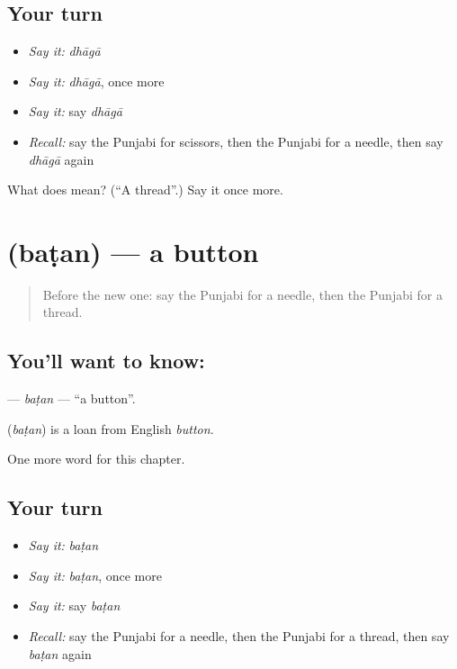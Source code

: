 \subsection*{Your turn}
\begin{itemize}
\raggedright
  \item \emph{Say it:} \emph{dhāgā}
  \item \emph{Say it:} \emph{dhāgā}, once more
  \item \emph{Say it:} say \emph{dhāgā}
  \item \emph{Recall:} say the Punjabi for scissors, then the Punjabi for a needle, then say \emph{dhāgā} again
\end{itemize}

\begin{tcolorbox}[breakable,colback=teal!4,colframe=teal!35!black,title={Before you move on}]
What does  mean? (\textquotedblleft{}A thread\textquotedblright{}.) Say it once more.
\end{tcolorbox}
\section[\texorpdfstring{\pa{ਬਟਨ} (baṭan)}{ਬਟਨ (baṭan)}]{ (baṭan) — a button}

\label{lesson:PA-C116-batan}



\begin{quote}
Before the new one: say the Punjabi for a needle, then the Punjabi for a thread.
\end{quote}

\subsection*{You'll want to know: }
\textbf{} — \emph{baṭan} — \textquotedblleft{}a button\textquotedblright{}.

\begin{cousinweb}
\textbf{} (\emph{baṭan}) is a loan from English \emph{button}.
\end{cousinweb}

\begin{grammarlens}[title={What you've built}]
One more word for this chapter.
\end{grammarlens}

\subsection*{Your turn}
\begin{itemize}
\raggedright
  \item \emph{Say it:} \emph{baṭan}
  \item \emph{Say it:} \emph{baṭan}, once more
  \item \emph{Say it:} say \emph{baṭan}
  \item \emph{Recall:} say the Punjabi for a needle, then the Punjabi for a thread, then say \emph{baṭan} again
\end{itemize}


